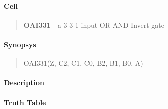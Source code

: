 \label{OAI331}
\paragraph{Cell}
\begin{quote}
    \textbf{OAI331} - a 3-3-1-input OR-AND-Invert gate
\end{quote}

\paragraph{Synopsys}
\begin{quote}
    OAI331(Z, C2, C1, C0, B2, B1, B0, A)
\end{quote}

\paragraph{Description}



\paragraph{Truth Table}


